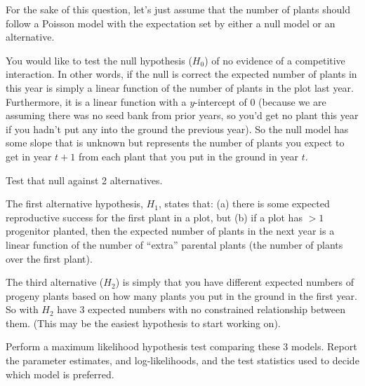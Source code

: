 \documentclass[11pt]{article}
\begin{document}
For the sake of this question, let's just assume that the number of plants should follow
    a Poisson model with the expectation set by either a null model or an alternative.

You would like to test the null hypothesis ($H_0$) of no evidence of a competitive interaction.
In other words, if the null is correct the expected number of plants in this year is 
simply a linear function of the number of plants in the plot last year.
Furthermore, it is a linear function with a $y$-intercept of 0 (because we are assuming there
was no seed bank from prior years, so you'd get no plant this year if you hadn't put
any into the ground the previous year).
So the null model has some slope that is unknown but represents the number of 
    plants you expect to get in year $t+1$ from each plant that you put in the ground in year $t$.


Test that null against 2 alternatives.

The first alternative hypothesis, $H_1$, states that: (a) there is some expected reproductive success 
    for the first plant in a plot, but (b) if a plot has $>1$ progenitor planted, then the expected number of plants in
    the next year is a linear function of the number of ``extra'' parental plants (the 
    number of plants over the first plant).


The third alternative ($H_2$) is simply that you have different expected numbers of progeny
    plants based on how many plants you put in the ground in the  first year. 
So with $H_2$ have 3 expected numbers with no constrained relationship between them.
(This may be the easiest hypothesis to start working on).


Perform a maximum likelihood hypothesis test comparing these 3 models.
Report the parameter estimates, and log-likelihoods, and the test statistics
    used to decide which model is preferred.
\end{document}
